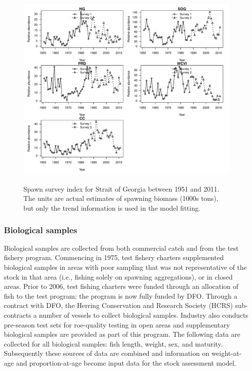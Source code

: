 \begin{figure}[!tbp]
	\includegraphics[width=\textwidth]{../Figs/iscam_fig_SurveyMajorAreas.pdf}\\
	\caption{Spawn survey index for Strait of Georgia between 1951 and 2011. The units are actual estimates of spawning biomass (1000s tons), but only the trend information is used in the model fitting.}\label{FigSurvey}
\end{figure}
	
	\subsubsection{Biological samples}
	
	Biological samples are collected from both commercial catch and from the test fishery program.  Commencing  in 1975, test fishery charters supplemented biological samples in areas with poor sampling that was not representative of the stock in that area (i.e., fishing solely on spawning aggregations), or in closed areas. Prior to 2006, test fishing charters were funded through an allocation of fish to the test program; the program is now fully funded by DFO.  Through a contract with DFO, the Herring Conservation and Research Society (HCRS) sub-contracts a number of vessels to collect biological samples.  Industry also conducts pre-season test sets for roe-quality testing in open areas and supplementary biological samples are provided as part of this program.  The following data are collected for all biological samples: fish length, weight, sex, and maturity.  Subsequently these sources of data are combined and information on weight-at-age and proportion-at-age become input data for the stock assessment model.
	
